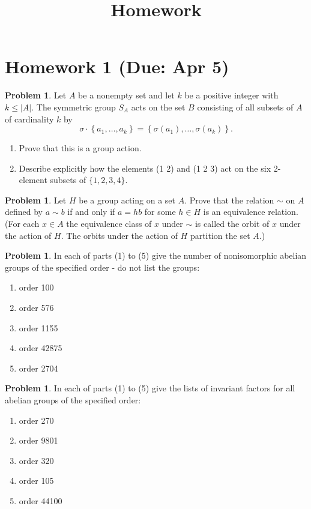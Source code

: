 \documentclass{amsart}
\title{Homework}
\numberwithin{equation}{section}
\theoremstyle{definition}
\newtheorem{problem}[thm]{Problem}
\begin{document}
\maketitle
\tableofcontents

\newpage
\section{Homework 1 (Due: Apr 5)}

\begin{problem}
 Let \(A\) be a nonempty set and let \(k\) be a positive integer with \(k \leq|A|\). The symmetric group \(S_A\) acts on the set \(B\) consisting of all subsets of \(A\) of cardinality \(k\) by 
 \[
   \sigma \cdot\left\{a_1, \ldots, a_k\right\}= \left\{\sigma\left(a_1\right), \ldots, \sigma\left(a_k\right)\right\}.
 \]
 \begin{enumerate}
 \item Prove that this is a group action.
 \item Describe explicitly how the elements (1 2) and (1 2 3) act on the six 2-element subsets of \(\{1,2,3,4\}\).
 \end{enumerate}

\end{problem}

\begin{problem}
  Let \(H\) be a group acting on a set \(A\). Prove that the relation
  \(\sim\) on \(A\) defined by \(a \sim b \) if and only if
  \( a=h b \) for some \(h \in H\) is an equivalence
  relation. (For each \(x \in A\) the equivalence class of \(x\) under
  \(\sim\) is called the orbit of \(x\) under the action of \(H\). The
  orbits under the action of \(H\) partition the set \(A\).)
\end{problem}


\begin{problem}
 In each of parts (1) to (5) give the number of nonisomorphic abelian groups of the specified order - do not list the groups:
\begin{enumerate}
\item order 100
\item order 576
\item order 1155
\item order 42875
\item order 2704
\end{enumerate}
\end{problem}

\begin{problem}
  In each of parts (1) to (5) give the lists of invariant factors for all abelian groups of the specified order:
\begin{enumerate}
\item order 270
\item order 9801
\item order 320
\item order 105
\item order 44100
\end{enumerate}
\end{problem}
\end{document}
